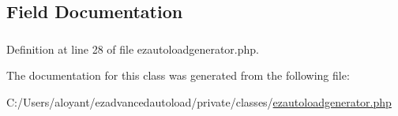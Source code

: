 \subsection{Field Documentation}
\hypertarget{classextension_1_1ezadvancedautoload_1_1pv_1_1classes_1_1e_z_autoload_generator_abe431f515e0a071f1ca74fd276813c19}{
\subsubsection[{\$active\-Extensions}]{}}\label{classextension_1_1ezadvancedautoload_1_1pv_1_1classes_1_1e_z_autoload_generator_abe431f515e0a071f1ca74fd276813c19}


Definition at line 28 of file ezautoloadgenerator.\-php.



The documentation for this class was generated from the following file\-:\begin{DoxyCompactItemize}
\item 
C\-:/\-Users/aloyant/ezadvancedautoload/private/classes/\hyperlink{ezautoloadgenerator_8php}{ezautoloadgenerator.\-php}\end{DoxyCompactItemize}

